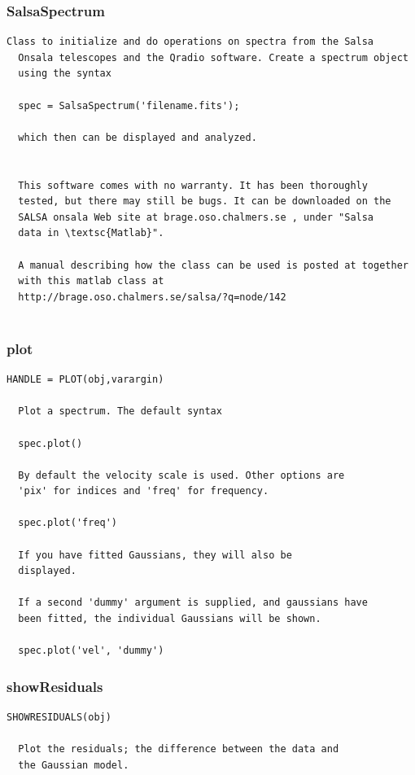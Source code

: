 \documentclass[11pt,a4paper]{article}
\begin{document}
\subsubsection*{SalsaSpectrum}
\label{sec:salsaspectrum}
\begin{lstlisting}[framerule=0pt]
  Class to initialize and do operations on spectra from the Salsa
  Onsala telescopes and the Qradio software. Create a spectrum object
  using the syntax
 
  spec = SalsaSpectrum('filename.fits');
 
  which then can be displayed and analyzed.
  
  
  This software comes with no warranty. It has been thoroughly
  tested, but there may still be bugs. It can be downloaded on the
  SALSA onsala Web site at brage.oso.chalmers.se , under "Salsa
  data in \textsc{Matlab}". 
  
  A manual describing how the class can be used is posted at together
  with this matlab class at
  http://brage.oso.chalmers.se/salsa/?q=node/142


\end{lstlisting}

\subsubsection*{plot}
\label{sec:plot}

\begin{lstlisting}[framerule=0pt]
  HANDLE = PLOT(obj,varargin)
  
  Plot a spectrum. The default syntax 
 
  spec.plot()
 
  By default the velocity scale is used. Other options are
  'pix' for indices and 'freq' for frequency.
 
  spec.plot('freq')
  
  If you have fitted Gaussians, they will also be
  displayed.
  
  If a second 'dummy' argument is supplied, and gaussians have
  been fitted, the individual Gaussians will be shown.
  
  spec.plot('vel', 'dummy')
\end{lstlisting}

\subsubsection*{showResiduals}
\label{sec:showresiduals}

\begin{lstlisting}[framerule=0pt]
  SHOWRESIDUALS(obj)
  
  Plot the residuals; the difference between the data and
  the Gaussian model. 
\end{lstlisting}
\end{document}
